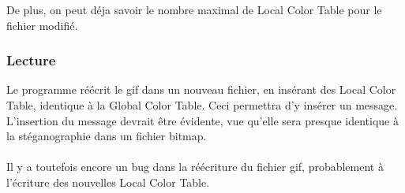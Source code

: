 De plus, on peut déja savoir le nombre maximal de Local Color Table pour le fichier modifié.

\subsubsection {Lecture}
Le programme réécrit le gif dans un nouveau fichier, en insérant des Local Color Table, identique à la Global Color Table. 
Ceci permettra d'y insérer un message. 
L'insertion du message devrait être évidente, vue qu'elle sera presque identique à la stéganographie dans un fichier bitmap.\\\\

Il y a toutefois encore un bug dans la réécriture du fichier gif, probablement à l'écriture des nouvelles Local Color Table.